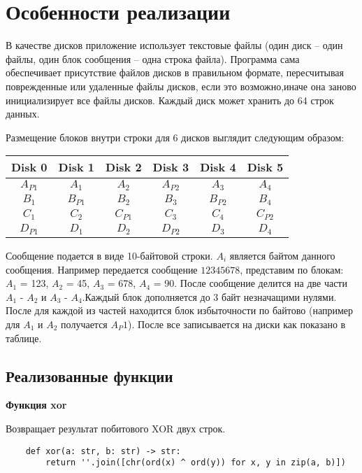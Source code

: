 \documentclass[10pt,a4paper,final]{article} %
\begin{document}
\newpage
\section{Особенности реализации}

В качестве дисков приложение использует текстовые файлы (один диск -- один файлы, один блок сообщения -- одна строка файла). Программа сама обеспечивает присутствие файлов дисков в правильном формате, пересчитывая поврежденные или удаленные файлы дисков, если это возможно,иначе она заново инициализирует все файлы дисков. Каждый диск может хранить до 64 строк данных.

Размещение блоков внутри строки для 6 дисков выглядит следующим образом:

\begin{table}[h!]
	\centering
	\begin{tabular}{|c|c|c|c|c|c|}
		\hline
		\textbf{Disk 0} & \textbf{Disk 1} & \textbf{Disk 2} & \textbf{Disk 3} & \textbf{Disk 4} & \textbf{Disk 5} \\
		\hline
		$A_{P1}$ & $A_1$ & $A_2$ & $A_{P2}$ & $A_3$ & $A_4$ \\
		\hline
		$B_1$ & $B_{P1}$ & $B_2$ & $B_3$ & $B_{P2}$ & $B_4$ \\
		\hline
		$C_1$ & $C_2$ & $C_{P1}$ & $C_3$ & $C_4$ & $C_{P2}$ \\
		\hline
		$D_{P1}$ & $D_1$ & $D_2$ & $D_{P2}$ & $D_3$ & $D_4$ \\
		\hline
	\end{tabular}
\end{table}

Сообщение подается в виде 10-байтовой строки. $A_i$ является байтом данного сообщения. Например передается сообщение $12345678$, представим по блокам: $A_1$ = 123, $A_2$ = 45, $A_3$ = 678, $A_4$ = 90. После сообщение делится на две части $A_1$ - $A_2$ и $A_3$ - $A_4$.Каждый блок дополняется до 3 байт незначащими нулями. После для каждой из частей находится блок избыточности по байтово (например для $A_1$ и $A_2$ получается $A_P1$). После все записывается на диски как показано в таблице.

\subsection{Реализованные функции}

\textbf{{\large Функция xor}}

Возвращает результат побитового XOR двух строк.

\begin{lstlisting}
	def xor(a: str, b: str) -> str:
		return ''.join([chr(ord(x) ^ ord(y)) for x, y in zip(a, b)])
	
\end{lstlisting}
\end{document}
